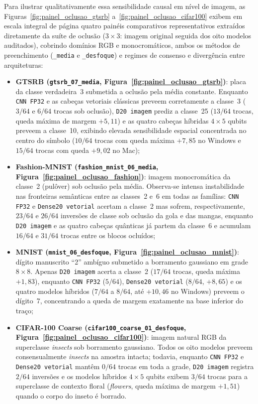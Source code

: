 \documentclass[
    12pt,
    openright,
    oneside,
    a4paper,
    english,
    brazil
]{abntex2}
\begin{document}
Para ilustrar qualitativamente essa sensibilidade causal em nível de imagem, as Figuras~\ref{fig:painel_oclusao_gtsrb} a~\ref{fig:painel_oclusao_cifar100} exibem em escala integral de página quatro painéis comparativos representativos extraídos diretamente da suíte de oclusão (\(3 \times 3\): imagem original seguida dos oito modelos auditados), cobrindo domínios RGB e monocromáticos, ambos os métodos de preenchimento (\texttt{\_media} e \texttt{\_desfoque}) e regimes de consenso e divergência entre arquiteturas:
\begin{itemize}
    \item \textbf{GTSRB (\texttt{gtsrb\_07\_media}, Figura~\ref{fig:painel_oclusao_gtsrb})}: placa da classe verdadeira~3 submetida a oclusão pela média constante. Enquanto \texttt{CNN FP32} e as cabeças vetoriais clássicas preveem corretamente a classe~3 (\(3/64\) e \(6/64\) trocas sob oclusão), \texttt{D20 imagem} prediz a classe~25 (\(13/64\) trocas, queda máxima de margem \(+5{,}11\)) e as quatro cabeças híbridas \(4 \times 5\) qubits preveem a classe~10, exibindo elevada sensibilidade espacial concentrada no centro do símbolo (\(10/64\) trocas com queda máxima \(+7{,}85\) no Windows e \(15/64\) trocas com queda \(+9{,}02\) no Mac);
    \item \textbf{Fashion-MNIST (\texttt{fashion\_mnist\_06\_media}, Figura~\ref{fig:painel_oclusao_fashion})}: imagem monocromática da classe~2 (pulôver) sob oclusão pela média. Observa-se intensa instabilidade nas fronteiras semânticas entre as classes~2 e~6 em todas as famílias: \texttt{CNN FP32} e \texttt{Dense20 vetorial} acertam a classe~2 mas sofrem, respectivamente, \(23/64\) e \(26/64\) inversões de classe sob oclusão da gola e das mangas, enquanto \texttt{D20 imagem} e as quatro cabeças quânticas já partem da classe~6 e acumulam \(16/64\) e \(31/64\) trocas entre os blocos ocluídos;
    \item \textbf{MNIST (\texttt{mnist\_06\_desfoque}, Figura~\ref{fig:painel_oclusao_mnist})}: dígito manuscrito ``2'' ambíguo submetido a borramento gaussiano em grade \(8 \times 8\). Apenas \texttt{D20 imagem} acerta a classe~2 (\(17/64\) trocas, queda máxima \(+1{,}83\)), enquanto \texttt{CNN FP32} (\(5/64\)), \texttt{Dense20 vetorial} (\(8/64\), \(+8{,}65\)) e os quatro modelos híbridos (\(7/64\) a \(8/64\), até \(+10{,}46\) no Windows) preveem o dígito~7, concentrando a queda de margem exatamente na base inferior do traço;
    \item \textbf{CIFAR-100 Coarse (\texttt{cifar100\_coarse\_01\_desfoque}, Figura~\ref{fig:painel_oclusao_cifar100})}: imagem natural RGB da superclasse \textit{insects} sob borramento gaussiano. Todos os oito modelos preveem consensualmente \textit{insects} na amostra intacta; todavia, enquanto \texttt{CNN FP32} e \texttt{Dense20 vetorial} mantêm \(0/64\) trocas em toda a grade, \texttt{D20 imagem} registra \(2/64\) inversões e os modelos híbridos \(4 \times 5\) qubits exibem \(3/64\) trocas para a superclasse de contexto floral (\textit{flowers}, queda máxima de margem \(+1{,}51\)) quando o corpo do inseto é borrado.
\end{itemize}
\end{document}
